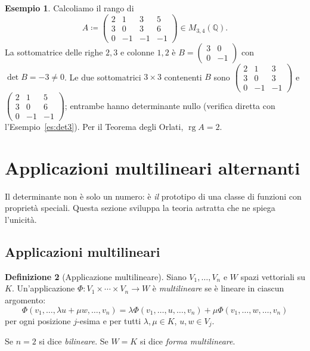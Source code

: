 \documentclass[11pt, a4paper]{book}
\theoremstyle{definition}
\newtheorem{definizione}{Definizione}[section]
\newtheorem{esempio}[definizione]{Esempio}
\theoremstyle{plain}
\theoremstyle{remark}
\newcommand{\Q}{\mathbb{Q}}
\DeclareMathOperator{\rg}{rg}
\begin{document}
\begin{exbox}
\begin{esempio}
Calcoliamo il rango di
\[
  A \coloneqq \begin{pmatrix} 2 & 1 & 3 & 5 \\ 3 & 0 & 3 & 6 \\ 0 & -1 & -1 & -1 \end{pmatrix} \in M_{3,4}(\Q).
\]
La sottomatrice delle righe $2,3$ e colonne $1,2$ è
$B = \begin{pmatrix}3&0\\0&-1\end{pmatrix}$
con $\det B = -3 \neq 0$. Le due sottomatrici $3\times 3$ contenenti $B$ sono
$\begin{pmatrix}2&1&3\\3&0&3\\0&-1&-1\end{pmatrix}$ e $\begin{pmatrix}2&1&5\\3&0&6\\0&-1&-1\end{pmatrix}$;
entrambe hanno determinante nullo (verifica diretta con l'Esempio~\ref{es:det3}). Per il Teorema degli Orlati, $\rg A = 2$.
\end{esempio}
\end{exbox}

\section{Applicazioni multilineari alternanti}
\label{sec:multilineare-alt}

Il determinante non è solo un numero: è \emph{il} prototipo di una classe di funzioni con proprietà speciali. Questa sezione sviluppa la teoria astratta che ne spiega l'unicità.

\subsection{Applicazioni multilineari}

\begin{defbox}
\begin{definizione}[Applicazione multilineare]
Siano $V_1,\ldots,V_n$ e $W$ spazi vettoriali su $K$. Un'applicazione $\Phi \colon V_1 \times \cdots \times V_n \to W$ è \emph{multilineare} se è lineare in ciascun argomento:
\[
  \Phi(v_1,\ldots,\lambda u + \mu w,\ldots,v_n) = \lambda\Phi(v_1,\ldots,u,\ldots,v_n) + \mu\Phi(v_1,\ldots,w,\ldots,v_n)
\]
per ogni posizione $j$-esima e per tutti $\lambda,\mu \in K$, $u,w \in V_j$.

Se $n=2$ si dice \emph{bilineare}. Se $W = K$ si dice \emph{forma multilineare}.
\end{definizione}
\end{defbox}
\end{document}
